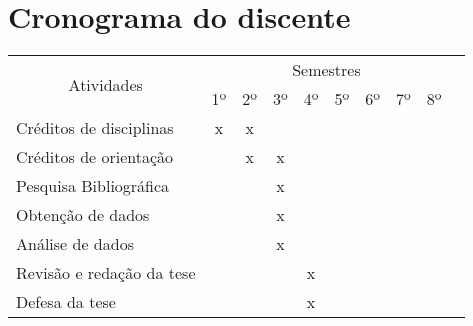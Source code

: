 \documentclass[12pt,a4paper,oneside]{book}
\begin{document}
\chapter{Cronograma do discente}
\begin{center}
    \begin{tabular}{|l|c|c|c|c|c|c|c|c|c|}
        \hline
        \multicolumn{1}{|c|}{\multirow{2}{*}{Atividades}} &
        \multicolumn{8}{c|}{Semestres} \\ \cline{2-9}
         & 1$º$ & 2$º$ & 3$º$ & 4$º$ & 5$º$ & 6$º$ & 7$º$ & 8$º$ \\ \hline
        Cr\'{e}ditos de disciplinas & x & x & & & & & & \\ \hline
        Cr\'{e}ditos de orienta\c{c}\~ao & & x & x & & & & & \\ \hline
        Pesquisa Bibliogr\'{a}fica & & & x & & & & & \\ \hline
        Obten\c{c}\~ao de dados & & & x & &  & & & \\ \hline
        An\'{a}lise de dados & & & x & & & & & \\ \hline
        Revis\~{a}o e reda\c{c}\~ao da tese & & & & x & & & & \\ \hline
        Defesa da tese & & & & x & & & & \\ \hline
    \end{tabular}
\end{center}
\pagebreak

\medskip
\printbibliography[heading=bibintoc,title={Refer\^{e}ncias},type=article]

\backmatter
\end{document}
